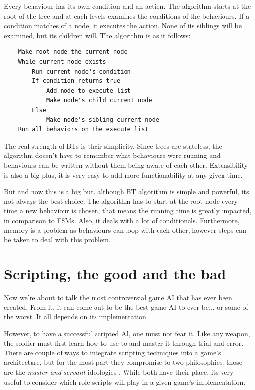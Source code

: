 \documentclass[a4paper, 12pt]{book}
\begin{document}
Every behaviour has its own condition and an action. The algorithm starts at the root of the tree and at each levels examines the conditions of the behaviours. If a condition matches of a node, it executes the action. None of its siblings will be examined, but its children will. The algorithm is as it follows:
\begin{verbatim}
    Make root node the current node
    While current node exists
        Run current node's condition
        If condition returns true
            Add node to execute list
            Make node's child current node
        Else
            Make node's sibling current node
    Run all behaviors on the execute list
\end{verbatim}

The real strength of BTs \cite{BehaviourSelectionAlgorithms} is their simplicity. Since trees are stateless, the algorithm doesn't have to remember what behaviours were running and behaviours can be written without them being aware of each other. Extensibility is also a big plus, it is very easy to add more functionability at any given time.

But and now this is a big but, although BT algorithm is simple and powerful, its not always the best choice. The algorithm has to start at the root node every time a new behaviour is chosen, that means the running time is greatly impacted, in comparison to FSMs. Also, it deals with a lot of conditionals. Furthermore, memory is a problem as behaviours can loop with each other, however steps can be taken to deal with this problem.

\section{Scripting, the good and the bad}

Now we're about to talk the most controversial game AI that has ever been created. From it, it can come out to be the best game AI to ever be... or some of the worst. It all depends on its implementation.

However, to have a successful scripted AI, one must not fear it. Like any weapon, the soldier must first learn how to use to and master it through trial and error. There are couple of ways to integrate scripting techniques into a game's architecture, but for the most part they compromise to two philosophies, those are the \emph{master and servant} ideologies \cite{ForbiddenScripting}. While both have their place, its very useful to consider which role scripts will play in a given game's implementation. 
\end{document}
